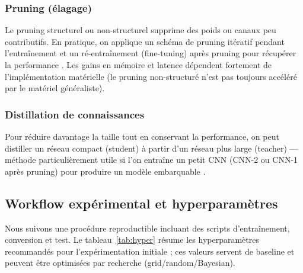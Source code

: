 \subsubsection{Pruning (élagage)}

Le pruning structurel ou non-structurel supprime des poids ou canaux peu contributifs. En pratique, on applique un schéma de pruning itératif pendant l'entraînement et un ré-entraînement (fine-tuning) après pruning pour récupérer la performance \autocite{hinton2015distillation}. Les gains en mémoire et latence dépendent fortement de l'implémentation matérielle (le pruning non-structuré n'est pas toujours accéléré par le matériel généraliste).

\subsubsection{Distillation de connaissances}

Pour réduire davantage la taille tout en conservant la performance, on peut distiller un réseau compact (student) à partir d'un réseau plus large (teacher) — méthode particulièrement utile si l’on entraîne un petit CNN (CNN-2 ou CNN-1 après pruning) pour produire un modèle embarquable \autocite{hinton2015distillation}.

\subsection{Workflow expérimental et hyperparamètres}

Nous suivons une procédure reproductible incluant des scripts d'entraînement, conversion et test. Le tableau~\ref{tab:hyper} résume les hyperparamètres recommandés pour l'expérimentation initiale ; ces valeurs servent de baseline et peuvent être optimisées par recherche (grid/random/Bayesian).

